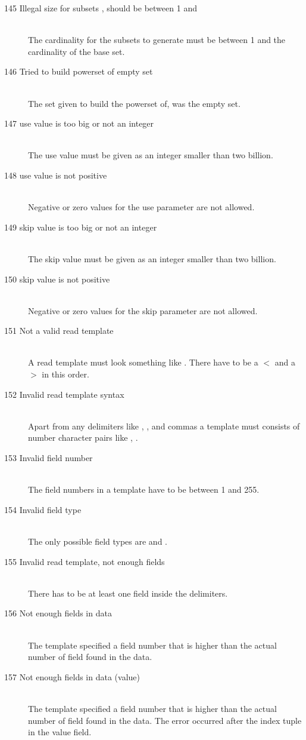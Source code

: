 \begin{description}
\item[145 Illegal size for subsets , should be between 1 
  and ]\ \\
  The cardinality for the subsets to generate must be between 1 
  and the cardinality of the base set.
\item[146 Tried to build powerset of empty set ]\ \\
  The set given to build the powerset of, was the empty set.
%
%
\item[147 use value  is too big or not an integer]\ \\
  The use value must be given as an integer smaller than two billion.
\item[148 use value  is not positive]\ \\
  Negative or zero values for the use parameter are not allowed.
\item[149 skip value  is too big or not an integer]\ \\
  The skip value must be given as an integer smaller than two billion.
\item[150 skip value  is not positive]\ \\
  Negative or zero values for the skip parameter are not allowed.
\item[151 Not a valid read template]\ \\
  A read template must look something like .
  There have to be a $<$ and a $>$ in this order.
\item[152 Invalid read template syntax]\ \\
  Apart from any delimiters like \code{$<$}, \code{$>$}, and commas a
  template must consists of number character pairs like , .
\item[153 Invalid field number ]\ \\
  The field numbers in a template have to be between 1 and 255.
\item[154 Invalid field type ]\ \\
  The only possible field types are  and .
\item[155 Invalid read template, not enough fields]\ \\
  There has to be at least one field inside the delimiters.
\item[156 Not enough fields in data]\ \\
  The template specified a field number that is higher than the actual
  number of field found in the data. 
\item[157 Not enough fields in data (value)]\ \\
  The template specified a field number that is higher than the actual
  number of field found in the data. The error occurred after the 
  index tuple in the value field.


\end{description}
